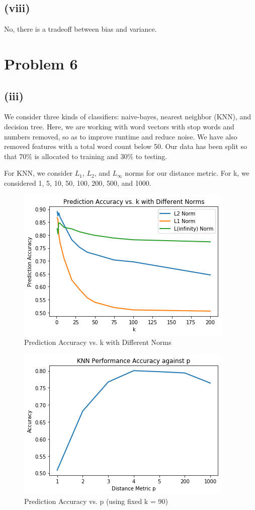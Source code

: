 \documentclass[twoside,11pt]{homework}
\begin{document}
\subsection*{(viii)}  
	No, there is a tradeoff between bias and variance.

\section*{Problem 6}
\subsection*{(iii)}
	We consider three kinds of classifiers: naive-bayes, nearest neighbor (KNN), and decision tree. Here, we are working with word vectors with stop words and numbers removed, so as to improve runtime and reduce noise. We have also removed features with a total word count below 50. Our data has been split so that 70\% is allocated to training and 30\% to testing.
	
	For KNN, we consider $L_1$, $L_2$, and $L_\infty$ norms for our distance metric. For k, we considered 1, 5, 10, 50, 100, 200, 500, and 1000.
	
		\begin{figure}[H]
		\centering
		\includegraphics[scale=.5]{q6_fig/knn_k.png}	
		\caption{Prediction Accuracy vs. k with Different Norms}
	\end{figure}

	\begin{figure}[H]
		\centering
		\includegraphics[scale=.5]{q6_fig/performance_vs_p.png}	
		\caption{Prediction Accuracy vs. p (using fixed k = 90)}
	\end{figure}
	
\end{document}
